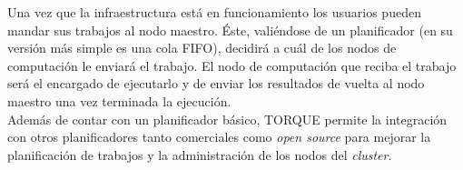 Una vez que la infraestructura está en funcionamiento los usuarios pueden mandar sus trabajos al nodo maestro. Éste, valiéndose de un planificador (en su versión más simple es una cola FIFO), decidirá a cuál de los nodos de computación le enviará el trabajo. El nodo de computación que reciba el trabajo será el encargado de ejecutarlo y de enviar los resultados de vuelta al nodo maestro una vez terminada la ejecución. \\


Además de contar con un planificador básico, TORQUE permite la integración con otros planificadores tanto comerciales como \emph{open source} para mejorar la planificación de trabajos y la administración de los nodos del \emph{cluster}.
